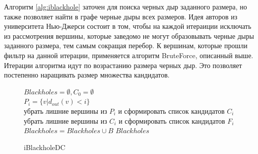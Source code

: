 \documentclass[12pt,a4paper,oneside,openany]{article}
\theoremstyle{definition}
\theoremstyle{lemma}
\theoremstyle{remark}
\begin{document}
Алгоритм \ref{alg:iblackhole} заточен для поиска черных дыр заданного размера, но также позволяет найти в графе черные дыры всех размеров.
Идея авторов из университета Нью-Джерси состоит в том, чтобы на каждой итераиции исключать из рассмотрения вершины, которые заведомо не могут
образовывать черные дыры заданного размера, тем самым сокращая перебор.
К вершинам, которые прошли фильтр на данной итерации, применяется алгоритм BruteForce, описанный выше.
Итерации алгоритма идут по возрастанию размера черных дыр. Это позволяет постепенно наращивать размер множества кандидатов.

\linespread{1.0}
\begin{figure}[H]
	\begin{center}
		\begin{algorithm}[H]
			\SetAlgoLined

                        $Blackholes = \emptyset, C_0 = \emptyset$ \\
                         {
                            $P_i = \{v | d_{out}(v) < i\}$ \\
                            убрать лишние вершины из $P_i$ и сформировать список кандидатов $C_i$ \\
                            убрать лишние вершины из $C_i$ и сформировать список кандидатов $F_i$ \\
                             {
                                 {
                                     {
                                         {
                                            $Blackholes = Blackholes \cup B$
                                        }
                                    }
                                }
                            }
                        }
                        \Return $Blackholes$
			\label{alg:iblackholedc}
			\caption{iBlackholeDC}
		\end{algorithm}
	\end{center}
\end{figure}
\linespread{1.5}
\end{document}
